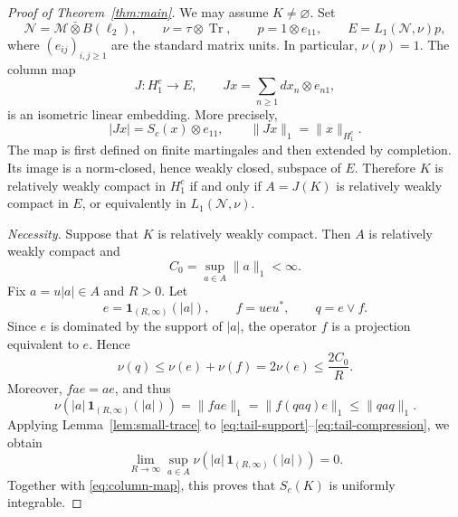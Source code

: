 \documentclass[11pt]{article}
\theoremstyle{remark}
\newcommand{\M}{\mathcal M}
\newcommand{\N}{\mathcal N}
\newcommand{\HH}{H_1^c}
\newcommand{\Tr}{\operatorname{Tr}}
\newcommand{\ind}{\mathbf 1}
\begin{document}
\begin{proof}[Proof of Theorem~\ref{thm:main}]
We may assume $K\neq\varnothing$. Set
\[
  \N=\M\bar\otimes B(\ell_2),\qquad
  \nu=\tau\otimes\Tr,\qquad
  p=1\otimes e_{11},\qquad
  E=L_1(\N,\nu)p,
\]
where $(e_{ij})_{i,j\geq 1}$ are the standard matrix units.
In particular, $\nu(p)=1$. The column map
\[
  J:\HH\longrightarrow E,\qquad
  Jx=\sum_{n\geq 1}dx_n\otimes e_{n1},
\]
is an isometric linear embedding. More precisely,
\begin{equation}\label{eq:column-map}
  |Jx|=S_c(x)\otimes e_{11},
  \qquad
  \|Jx\|_1=\|x\|_{\HH}.
\end{equation}
The map is first defined on finite martingales and then extended by
completion. Its image is a norm-closed, hence weakly closed, subspace
of $E$. Therefore $K$ is relatively weakly compact in $\HH$ if and only
if $A=J(K)$ is relatively weakly compact in $E$, or equivalently in
$L_1(\N,\nu)$.

\medskip
\noindent\emph{Necessity.}
Suppose that $K$ is relatively weakly compact. Then $A$ is relatively
weakly compact and
\[
  C_0=\sup_{a\in A}\|a\|_1<\infty.
\]
Fix $a=u|a|\in A$ and $R>0$. Let
\[
  e=\ind_{(R,\infty)}(|a|),\qquad
  f=ueu^*,\qquad q=e\vee f.
\]
Since $e$ is dominated by the support of $|a|$, the operator $f$ is a
projection equivalent to $e$. Hence
\begin{equation}\label{eq:tail-support}
  \nu(q)\leq\nu(e)+\nu(f)
  =2\nu(e)\leq\frac{2C_0}{R}.
\end{equation}
Moreover, $fae=ae$, and thus
\begin{equation}\label{eq:tail-compression}
  \nu\!\left(|a|\,\ind_{(R,\infty)}(|a|)\right)
  =\|fae\|_1
  =\|f(qaq)e\|_1
  \leq\|qaq\|_1.
\end{equation}
Applying Lemma~\ref{lem:small-trace} to
\eqref{eq:tail-support}--\eqref{eq:tail-compression}, we obtain
\[
  \lim_{R\to\infty}\sup_{a\in A}
  \nu\!\left(|a|\,\ind_{(R,\infty)}(|a|)\right)=0.
\]
Together with \eqref{eq:column-map}, this proves that $S_c(K)$ is
uniformly integrable.


\end{proof}
\end{document}
